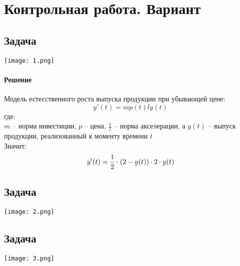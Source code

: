 \section{Контрольная работа. Вариант }

\subsection{Задача }
\texttt{[image: 1.png]}
\paragraph{Решение}
Модель естесственного роста выпуска продукции при убывающей цене:
\begin{equation} \label{eq:model}
	y'(t) = mp(t)ly(t)
\end{equation}
где: \\
$m$ -- норма инвестиции, $p$ -- цена, $\frac{1}{l}$ -- норма акселерации, а $y(t)$ -- выпуск продукции, реализованный к моменту времени $t$ \\
Значит:
\begin{equation}
	y'(t) = \frac{1}{2} \cdot (2 - y(t)) \cdot 2 \cdot y(t) \\
\end{equation}

\newpage
\subsection{Задача }
\texttt{[image: 2.png]}

\newpage
\subsection{Задача }
\texttt{[image: 3.png]}
